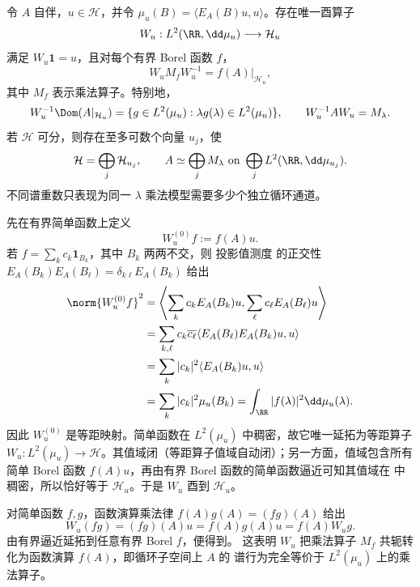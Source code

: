 \begin{theorem}[循环谱表示与谱重数分解]\label{thm:math-sl-cyclic-spectral-representation}
令 $A$ 自伴，$u\in\mathcal H$，并令
$\mu_u(B)=\langle E_A(B)u,u\rangle$。存在唯一酉算子
\[
 W_u:L^2(\RR,\dd\mu_u)\longrightarrow\mathcal H_u
\]
满足 $W_u\mathbf1=u$，且对每个有界 Borel 函数 $f$，
\begin{equation}\label{eq:math-sl-cyclic-intertwining}
 W_u M_f W_u^{-1}=f(A)|_{\mathcal H_u},
\end{equation}
其中 $M_f$ 表示乘法算子。特别地，
\begin{equation}\label{eq:math-sl-cyclic-domain}
 W_u^{-1}\Dom(A|_{\mathcal H_u})
 =\{g\in L^2(\mu_u):\lambda g(\lambda)\in L^2(\mu_u)\},
 \qquad
 W_u^{-1}AW_u=M_\lambda.
\end{equation}
若 $\mathcal H$ 可分，则存在至多可数个向量 $u_j$，使
\begin{equation}\label{eq:math-sl-countable-cyclic-decomposition}
 \mathcal H=\bigoplus_j\mathcal H_{u_j},
 \qquad
 A\simeq\bigoplus_j M_\lambda
 \text{ on }\bigoplus_jL^2(\RR,\dd\mu_{u_j}).
\end{equation}
不同谱重数只表现为同一 $\lambda$ 乘法模型需要多少个独立循环通道。
\end{theorem}

先在有界简单函数上定义
\[
 W_u^{(0)}f:=f(A)u.
\]
若 $f=\sum_kc_k\mathbf1_{B_k}$，其中 $B_k$ 两两不交，则 投影值测度 的正交性
$E_A(B_k)E_A(B_\ell)=\delta_{k\ell}E_A(B_k)$ 给出
\begin{align*}
 \norm{W_u^{(0)}f}^2
 &=\left\langle
 \sum_kc_kE_A(B_k)u,
 \sum_\ell c_\ell E_A(B_\ell)u
 \right\rangle\\
 &=\sum_{k,\ell}c_k\overline{c_\ell}
 \langle E_A(B_\ell)E_A(B_k)u,u\rangle\\
 &=\sum_k|c_k|^2\langle E_A(B_k)u,u\rangle\\
 &=\sum_k|c_k|^2\mu_u(B_k)
 =\int_{\RR}|f(\lambda)|^2\dd\mu_u(\lambda).
\end{align*}
因此 $W_u^{(0)}$ 是等距映射。简单函数在 $L^2(\mu_u)$ 中稠密，故它唯一延拓为等距算子
$W_u:L^2(\mu_u)\to\mathcal H$。其值域闭（等距算子值域自动闭）；另一方面，值域包含所有
简单 Borel 函数 $f(A)u$，再由有界 Borel 函数的简单函数逼近可知其值域在
 中稠密，所以恰好等于 $\mathcal H_u$。于是
$W_u$ 酉到 $\mathcal H_u$。

对简单函数 $f,g$，函数演算乘法律 $f(A)g(A)=(fg)(A)$ 给出
\[
 W_u(fg)=(fg)(A)u=f(A)g(A)u=f(A)W_ug.
\]
由有界逼近延拓到任意有界 Borel $f$，便得到。
这表明 $W_u$ 把乘法算子 $M_f$ 共轭转化为函数演算 $f(A)$，即循环子空间上 $A$ 的
谱行为完全等价于 $L^2(\mu_u)$ 上的乘法算子。

